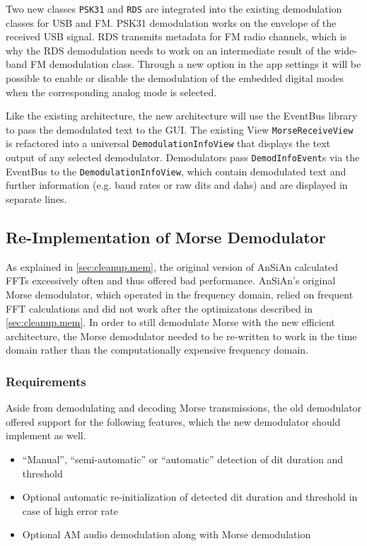 Two new classes \texttt{PSK31} and \texttt{RDS} are integrated into the
existing demodulation classes for \ac{USB} and \ac{FM}. \ac{PSK31} demodulation
works on the envelope of the received \ac{USB} signal.  \ac{RDS} transmits
metadata for \ac{FM} radio channels, which is why the \ac{RDS} demodulation
needs to work on an intermediate result of the wide-band \ac{FM} demodulation
class. Through a new option in the app settings it will be possible to enable
or disable the demodulation of the embedded digital modes when the
corresponding analog mode is selected.

Like the existing architecture, the new architecture will use the EventBus
library to pass the demodulated text to the \ac{GUI}. The existing View
\texttt{MorseReceiveView} is refactored into a universal
\texttt{De\-mo\-du\-la\-tion\-In\-fo\-View} that displays the text output of any selected 
demodulator. Demodulators pass
\texttt{DemodInfoEvent}s via the EventBus to the \texttt{De\-mo\-du\-la\-tion\-In\-fo\-View}, 
which contain demodulated text and further information (e.g. baud rates or raw 
dits and dahs) and are displayed in separate lines.

\subsection{Re-Implementation of Morse Demodulator\label{sec:morse_demod}}

As explained in \autoref{sec:cleanup.mem}, the original version of \ac{AnSiAn} calculated \acp{FFT} excessively often and thus offered bad performance. \ac{AnSiAn}'s original Morse demodulator, which operated in the frequency domain, relied on frequent \ac{FFT} calculations and did not work after the optimizatons described in \autoref{sec:cleanup.mem}. In order to still demodulate Morse with the new efficient architecture, the Morse demodulator needed to be re-written to work in the time domain rather than the computationally expensive frequency domain.

\subsubsection{Requirements}

Aside from demodulating and decoding Morse transmissions, the old demodulator offered support for the following features, which the new demodulator should implement as well.

\begin{itemize}
  \item ``Manual'', ``semi-automatic'' or ``automatic'' detection of dit duration and threshold
  \item Optional automatic re-initialization of detected dit duration and threshold in case of high error rate
  \item Optional \ac{AM} audio demodulation along with Morse demodulation
\end{itemize}

